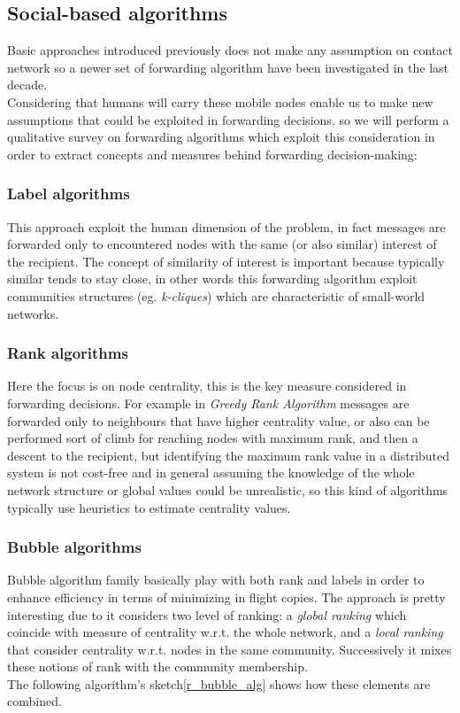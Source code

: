\subsection{Social-based algorithms}
\label{f_social}
Basic approaches introduced previously does not make any assumption on contact network so a newer set of forwarding algorithm have been investigated in the last decade.\\ Considering that humans will carry these mobile nodes enable us to make new assumptions that could be exploited in forwarding decisions, so we will perform a qualitative survey on forwarding algorithms which exploit this consideration in order to extract concepts and measures behind forwarding decision-making:

\subsubsection{Label algorithms}
This approach exploit the human dimension of the problem, in fact messages are forwarded only to encountered nodes with the same (or also similar) interest of the recipient. The concept of similarity of interest is important because typically similar tends to stay close, in other words this forwarding algorithm exploit communities structures (eg. \emph{k-cliques}) which are characteristic of small-world networks.

\subsubsection{Rank algorithms} 
Here the focus is on node centrality, this is the key measure considered in forwarding decisions. For example in \emph{Greedy Rank Algorithm} messages are forwarded only to neighbours that have higher centrality value, or also can be performed sort of climb for reaching nodes with maximum rank, and then a descent to the recipient\cite{PhysRevE.64.046135}, but identifying the maximum rank value in a distributed system is not cost-free and in general assuming the knowledge of the whole network structure or global values could be unrealistic, so this kind of algorithms typically use heuristics to estimate centrality values.

\subsubsection{Bubble algorithms}
\label{f_bubble}
Bubble algorithm\cite{bubble} family basically play with both rank and labels in order to enhance efficiency in terms of minimizing in flight copies. The approach is pretty interesting due to it considers two level of ranking: a \emph{global ranking} which coincide with measure of centrality w.r.t. the whole network, and a \emph{local ranking} that consider centrality w.r.t. nodes in the same community. Successively it mixes these notions of rank with the community membership.\\
The following algorithm's sketch\ref{r_bubble_alg} shows how these elements are combined.

